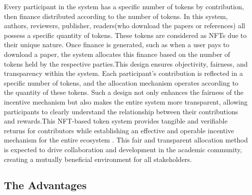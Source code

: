 \documentclass[lettersize,journal]{IEEEtran}
\begin{document}
Every participant in the system has a specific number of tokens by contribution, then finance distributed according to the number of tokens. In this system, authors, reviewers, publisher, readers(who download the papers or references) all possess a specific quantity of tokens. These tokens are considered as NFTs due to their unique nature. Once finance is generated, such as when a user pays to download a paper, the system allocates this finance based on the number of tokens held by the respective parties.This design ensures objectivity, fairness, and transparency within the system. Each participant's contribution is reflected in a specific number of tokens, and the allocation mechanism operates according to the quantity of these tokens. Such a design not only enhances the fairness of the incentive mechanism but also makes the entire system more transparent, allowing participants to clearly understand the relationship between their contributions and rewards.This NFT-based token system provides tangible and verifiable returns for contributors while establishing an effective and operable incentive mechanism for the entire ecosystem \cite{kong2021alternative}. This fair and transparent allocation method is expected to drive collaboration and development in the academic community, creating a mutually beneficial environment for all stakeholders.




\subsection{The Advantages}
\end{document}
